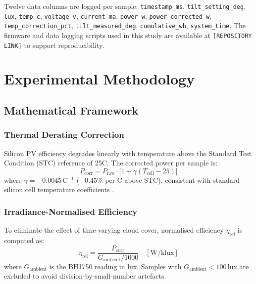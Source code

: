\documentclass[conference]{IEEEtran}
\begin{document}
Twelve data columns are logged per sample: \texttt{timestamp\_ms}, \texttt{tilt\_setting\_deg},
\texttt{lux}, \texttt{temp\_c}, \texttt{voltage\_v}, \texttt{current\_ma}, \texttt{power\_w},
\texttt{power\_corrected\_w}, \texttt{temp\_correction\_pct}, \texttt{tilt\_measured\_deg},
\texttt{cumulative\_wh}, \texttt{system\_time}. The firmware and data logging scripts used
in this study are available at \texttt{[REPOSITORY LINK]} to support reproducibility.

\section{Experimental Methodology}
\label{sec:methodology}

\subsection{Mathematical Framework}

\subsubsection{Thermal Derating Correction}
Silicon PV efficiency degrades linearly with temperature above the Standard Test Condition (STC)
reference of 25\degree{}C. The corrected power per sample is:
\begin{equation}
  P_{\text{corr}} = P_{\text{raw}} \cdot \bigl[1 + \gamma(T_{\text{cell}} - 25)\bigr]
  \label{eq:thermal}
\end{equation}
where $\gamma = -0.0045$\,\degree{}C$^{-1}$ ($-0.45\%$ per \degree{}C above STC),
consistent with standard silicon cell temperature coefficients \cite{green2003}.

\subsubsection{Irradiance-Normalised Efficiency}
To eliminate the effect of time-varying cloud cover, normalised efficiency $\eta_{\text{rel}}$
is computed as:
\begin{equation}
  \eta_{\text{rel}} = \frac{P_{\text{corr}}}{G_{\text{ambient}} / 1000}
  \quad [\text{W/klux}]
  \label{eq:noreff}
\end{equation}
where $G_{\text{ambient}}$ is the BH1750 reading in lux. Samples with
$G_{\text{ambient}} < 100$\,lux are excluded to avoid division-by-small-number artefacts.
\end{document}
